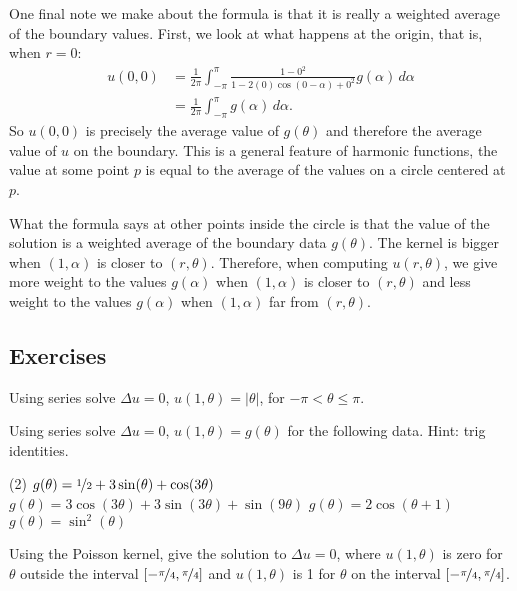 One final note we make about the formula is that it is really
a weighted average of the boundary values.
First, we look
at what happens at the origin,
that is, when $r=0$: %
\begin{equation*}
\begin{split}
u(0,0) &= 
\frac{1}{2\pi} \int_{-\pi}^{\pi}
\frac{1 -0^2}{1 - 2(0)\cos(0-\alpha) +0^2} g(\alpha) \, d\alpha
\\
& =
\frac{1}{2\pi} \int_{-\pi}^{\pi}
g(\alpha) \, d\alpha .
\end{split}
\end{equation*}
So $u(0,0)$ is precisely the average value of $g(\theta)$ and
therefore the average value of $u$ on the boundary.  This is
a general feature of harmonic functions, the value at some point $p$
is equal to the average of the values on a circle centered at $p$.

What the formula says at other points inside the circle
is that the value of the solution
is a weighted average of the boundary data $g(\theta)$.  The kernel
is bigger when $(1,\alpha)$ is closer to $(r,\theta)$.  Therefore, when
computing $u(r,\theta)$, we
give more weight to the values $g(\alpha)$ when $(1,\alpha)$ is closer to $(r,\theta)$ and less
weight to the values $g(\alpha)$ when $(1,\alpha)$ far from $(r,\theta)$.

\subsection{Exercises}

\begin{exercise}
Using series solve
$\Delta u = 0$, $u(1,\theta) = \lvert \theta \rvert$, for $-\pi < \theta
\leq \pi$.
\end{exercise}

\begin{exercise}
Using series solve $\Delta u = 0$, $u(1,\theta) = g(\theta)$ for the
following data.  Hint: trig identities.
\begin{tasks}(2)
\task
$g(\theta) = 
\nicefrac{1}{2} + 3\sin(\theta) + \cos(3\theta)$
\task
$g(\theta) = 
3\cos(3\theta) + 3\sin(3\theta) + \sin(9\theta)$
\task
$g(\theta) = 2 \cos(\theta+1)$
\task
$g(\theta) = \sin^2(\theta)$
\end{tasks}
\end{exercise}

\begin{exercise}
Using the Poisson kernel, give the solution to
$\Delta u = 0$, where $u(1,\theta)$ is zero for $\theta$ outside
the interval $[-\nicefrac{\pi}{4},\nicefrac{\pi}{4}]$ and 
$u(1,\theta)$ is 1 for $\theta$ on the interval
$[-\nicefrac{\pi}{4},\nicefrac{\pi}{4}]$.
\end{exercise}

